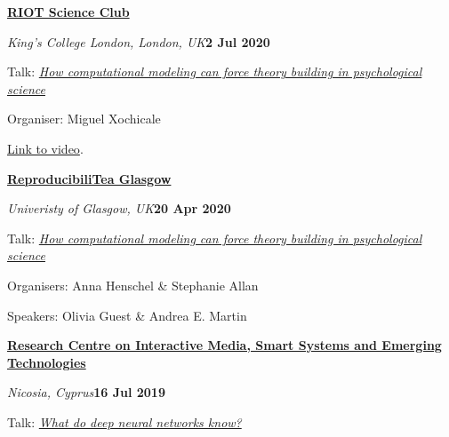 \documentclass[10pt]{article}
\newenvironment{outerlist}[1][\enskip\textbullet]%
        {\begin{itemize}[#1]}{\end{itemize}%
         \vspace{-.6\baselineskip}}
\newenvironment{innerlist}[1][\enskip\textbullet]%
        {\begin{compactitem}[#1]}{\end{compactitem}}
\begin{document}
\textbf{\href{https://www.kcl.ac.uk/events/series/riot-science-club}{RIOT Science Club}} 
\begin{outerlist}
  \item[] \textit{King's College London, London, UK}\hfill\textbf{2 Jul 2020}
  \begin{innerlist}
    \item Talk: \href{https://youtu.be/IhlF0B_IQJE}{\textit{How computational modeling can force theory building in psychological science}}
    \item Organiser: Miguel Xochicale
    \item \href{https://youtu.be/IhlF0B_IQJE}{Link to video}.


  \end{innerlist}
\end{outerlist}
\vspace{8pt}


\textbf{\href{https://github.com/annahensch/Glasgow-ReproducibiliTea}{ReproducibiliTea Glasgow}} 
\begin{outerlist}
  \item[] \textit{Univeristy of Glasgow, UK}\hfill\textbf{20 Apr 2020}
  \begin{innerlist}
    \item Talk: \textit{\href{https://www.youtube.com/watch?v=_WV7EFvFAB8}{How computational modeling can force theory building in psychological science}}
    \item Organisers: Anna Henschel \& Stephanie Allan
    \item Speakers: Olivia Guest \& Andrea E. Martin
  \end{innerlist}
\end{outerlist}
\vspace{8pt}

\textbf{\href{http://www.rise.org.cy/en-gb/}{Research Centre on Interactive Media, Smart Systems and Emerging Technologies}}
\begin{outerlist}
  \item[] \textit{Nicosia, Cyprus}\hfill\textbf{16 Jul 2019}
  \begin{innerlist}
    \item Talk: \textit{\href{https://dx.doi.org/10.1101/626374}{What do deep neural networks know?}}
  \end{innerlist}
\end{outerlist}
\vspace{8pt}
\end{document}
